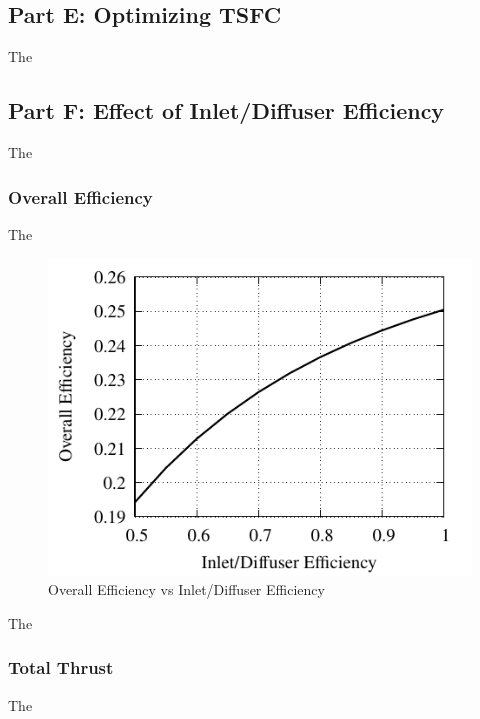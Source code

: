 \documentclass[conf]{new-aiaa} %
\begin{document}
\subsection{Part E: Optimizing TSFC}
The

\subsection{Part F: Effect of Inlet/Diffuser Efficiency}
The

\subsubsection{Overall Efficiency}
The

\begin{figure}[hbt!]
\centering
\includegraphics[]{media/performance_parameter_files/part_f_eta_o.pdf}
\caption{\label{fig:partfetao} Overall Efficiency vs Inlet/Diffuser Efficiency}
\end{figure}
The

\subsubsection{Total Thrust}
The
\end{document}
